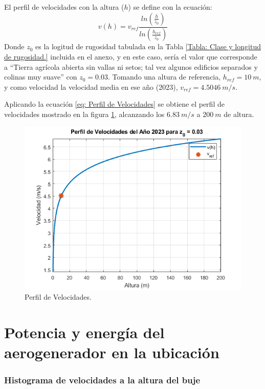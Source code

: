 \documentclass{IEEEtran}
\begin{document}
El perfil de velocidades con la altura ($h$) se define con la ecuación:
\begin{equation}
    v(h) = v_{ref} \frac{ln \left( \frac{h}{z_0} \right)}{ln \left( \frac{h_{ref}}{z_0} \right)}
    \label{eq: Perfil de Velocidades}
\end{equation}
Donde $z_0$ es la logitud de rugosidad tabulada en la Tabla \ref{Tabla: Clase y longitud de rugosidad.} incluida en el anexo, y en este caso, sería el valor que corresponde a ``Tierra agrícola abierta sin vallas ni setos; tal vez algunos edificios separados y colinas muy suave'' con  $z_0 = 0.03$. Tomando una altura de referencia, $h_{ref} = 10\ m$, y como velocidad la velocidad media en ese año (2023), $v_{ref} = 4.5046\ m/s$. 

Aplicando la ecuación \ref{eq: Perfil de Velocidades} se obtiene el perfil de velocidades mostrado en la figura \ref{fig: Perfil de Velocidades}, alcanzando los $6.83\ m/s$ a $200\ m$ de altura.

\begin{figure}[h]
    \centering
    \includegraphics[width = 0.5 \textwidth]{Imagenes/Perfil de Velocidades.png}
    \caption{Perfil de Velocidades.}
    \label{fig: Perfil de Velocidades}
\end{figure}

\section{Potencia y energía del aerogenerador en la ubicación}


\subsubsection{Histograma de velocidades a la altura del buje}
\end{document}
